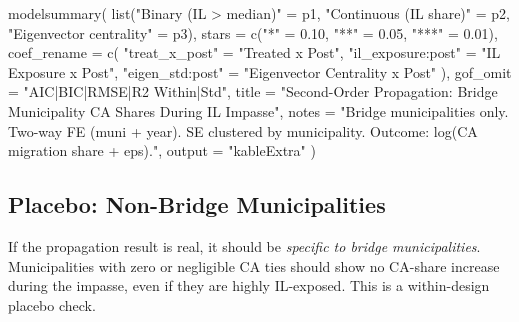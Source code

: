 \documentclass[
  11pt,
  letterpaper,
  DIV=11,
  numbers=noendperiod]{scrartcl}
\newenvironment{Shaded}{}{}
\newcommand{\AttributeTok}[1]{\textcolor[rgb]{0.84,0.23,0.29}{#1}}
\newcommand{\FloatTok}[1]{\textcolor[rgb]{0.00,0.36,0.77}{#1}}
\newcommand{\FunctionTok}[1]{\textcolor[rgb]{0.44,0.26,0.76}{#1}}
\newcommand{\NormalTok}[1]{\textcolor[rgb]{0.14,0.16,0.18}{#1}}
\newcommand{\OtherTok}[1]{\textcolor[rgb]{0.44,0.26,0.76}{#1}}
\newcommand{\StringTok}[1]{\textcolor[rgb]{0.01,0.18,0.38}{#1}}
\begin{document}
\begin{Shaded}
\begin{Highlighting}[]
\FunctionTok{modelsummary}\NormalTok{(}
  \FunctionTok{list}\NormalTok{(}\StringTok{"Binary (IL \textgreater{} median)"} \OtherTok{=}\NormalTok{ p1,}
       \StringTok{"Continuous (IL share)"} \OtherTok{=}\NormalTok{ p2,}
       \StringTok{"Eigenvector centrality"} \OtherTok{=}\NormalTok{ p3),}
  \AttributeTok{stars      =} \FunctionTok{c}\NormalTok{(}\StringTok{"*"} \OtherTok{=} \FloatTok{0.10}\NormalTok{, }\StringTok{"**"} \OtherTok{=} \FloatTok{0.05}\NormalTok{, }\StringTok{"***"} \OtherTok{=} \FloatTok{0.01}\NormalTok{),}
  \AttributeTok{coef\_rename =} \FunctionTok{c}\NormalTok{(}
    \StringTok{"treat\_x\_post"}     \OtherTok{=} \StringTok{"Treated x Post"}\NormalTok{,}
    \StringTok{"il\_exposure:post"} \OtherTok{=} \StringTok{"IL Exposure x Post"}\NormalTok{,}
    \StringTok{"eigen\_std:post"}   \OtherTok{=} \StringTok{"Eigenvector Centrality x Post"}
\NormalTok{  ),}
  \AttributeTok{gof\_omit   =} \StringTok{"AIC|BIC|RMSE|R2 Within|Std"}\NormalTok{,}
  \AttributeTok{title      =} \StringTok{"Second{-}Order Propagation: Bridge Municipality CA Shares During IL Impasse"}\NormalTok{,}
  \AttributeTok{notes      =} \StringTok{"Bridge municipalities only. Two{-}way FE (muni + year). SE clustered by municipality. Outcome: log(CA migration share + eps)."}\NormalTok{,}
  \AttributeTok{output     =} \StringTok{"kableExtra"}
\NormalTok{)}
\end{Highlighting}
\end{Shaded}

\subsection{Placebo: Non-Bridge
Municipalities}\label{placebo-non-bridge-municipalities}

If the propagation result is real, it should be \emph{specific to bridge
municipalities}. Municipalities with zero or negligible CA ties should
show no CA-share increase during the impasse, even if they are highly
IL-exposed. This is a within-design placebo check.
\end{document}
